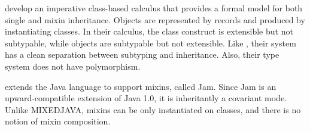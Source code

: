 \citet{bono1999core} develop an imperative class-based calculus that provides a
formal model for both single and mixin inheritance. Objects are represented by
records and produced by instantiating classes. In their calculus, the class
construct is extensible but not subtypable, while objects are subtypable but not
extensible. Like \name, their system has a clean separation between subtyping
and inheritance. Also, their type system does not have polymorphism.

\citet{ancona2003jam} extends the Java language to support mixins, called Jam.
Since Jam is an upward-compatible extension of Java 1.0, it is inheritantly a
covariant mode. Unlike MIXEDJAVA, mixins can be only instantiated on classes,
and there is no notion of mixin composition.


\begin{comment}

\begin{itemize}


\item ``Object-Oriented Multi-Methods in Cecil''

\item ``Dimensions of Object-Based Language Design''

\item ``On the Semantic Diversity of Delegation-Based Programming Languages''

\item ``Self: The power of simplicity''

\item ``Type-safe delegation for run-time component adaptation''

\item ``A delegation-based object calculus with subtyping''

\item ``Can Addresses be Types? (a case study: objects with delegation)''

\item ``Inheritance is not subtyping''


Mixins

\item ``mixin-based inheritance''

\item ``Classes and mixins''

\item ``A core calculus of classes and mixins''

\item ``A core calculus of higher-order mixins and classes''

\item ``Jam—Designing a Java Extension with Mixins''



\end{itemize}

Do they have polymorphic type systems? Do they support mutable self reference?

\end{comment}


